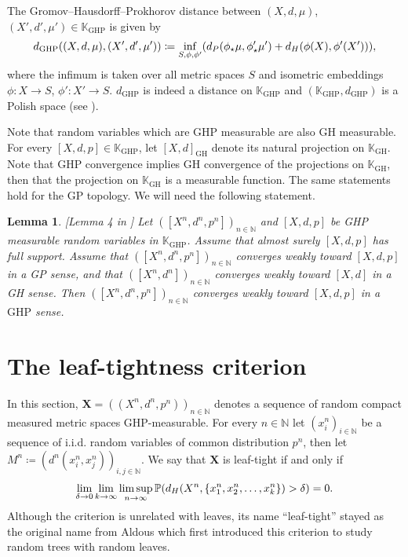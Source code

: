 \documentclass[11pt]{article}
\theoremstyle{plain}
\newtheorem{lemma}[theorem]{Lemma}
\theoremstyle{definition}
\theoremstyle{remark}
\newcommand{\N}{\mathbb{N}} %
\newcommand{\1}{\mathbbm{1}} %
\newcommand{\proba}[1]{\mathbb{P}\left(#1\right)} %
\newcommand{\K}{\mathbb{K}}
\newcommand{\GH}{\text{GH}}
\newcommand{\GHP}{\text{GHP}}
\let\originalleft\left
\let\originalright\right
\renewcommand{\left}{\mathopen{}\mathclose\bgroup\originalleft}
\renewcommand{\right}{\aftergroup\egroup\originalright}
\begin{document}
 The Gromov--Hausdorff--Prokhorov distance between $(X,d,\mu)$,$(X',d',\mu')\in \K_{\GHP}$ is given by 
\[ d_{\GHP}((X,d,\mu),(X',d',\mu'))\coloneqq\inf_{S,\phi,\phi'} \left ( d_P(\phi_\star \mu, \phi'_\star\mu')+d_H(\phi(X), \phi'(X')) \right ),\]
where the infimum is taken over all metric spaces $S$ and isometric embeddings $\phi :X\to S$, $\phi' :X'\to S$. $d_{\GHP}$ is indeed a distance on $\K_{\GHP}$ and $(\K_{\GHP},d_{\GHP})$ is a Polish space (see  \cite{ADH13}).

Note that random variables which are $\GHP$ measurable are also $\GH$ measurable. For every $[X,d,p]\in \K_{\GHP}$, let $[X,d]_{\GH}$ denote its natural projection on $\K_{\GH}$. Note that GHP convergence implies GH convergence of the projections on $\K_{\GH}$, then that the projection on $\K_{\GH}$ is a measurable function. The same statements hold for the GP topology. We will need the following statement.

\begin{lemma} \label{GP+GH=GHP}[Lemma 4 in \cite{Bla21}] Let $([X^n,d^n,p^n])_{n\in \N}$ and $[X,d,p]$ be GHP measurable random variables in $\K_{\GHP}$. Assume that almost surely $[X,d,p]$ has full support. Assume that $([X^n,d^n,p^n])_{n\in \N}$ converges weakly toward $[X,d,p]$ in a GP sense, and that $([X^n,d^n])_{n\in \N}$ converges weakly toward $[X,d]$ in a GH sense. Then $([X^n,d^n,p^n])_{n\in \N}$ converges weakly toward $[X,d,p]$ in a $\GHP$ sense.
\end{lemma}



\section{The leaf-tightness criterion}
\label{sec:leaf}
In this section, $\mathbf X=((X^n,d^n,p^n))_{n\in \N}$ denotes  a sequence of random compact measured metric spaces GHP-measurable. For every $n\in \N$ let $(x_i^n)_{i\in \N}$ be a sequence of i.i.d. random variables of common distribution $p^n$, then let $M^n\coloneqq(d^n(x_i^n,x_j^n))_{i,j\in \N}$. We say that $\mathbf X$ is leaf-tight if and only if
\begin{equation} \lim_{\delta\to 0} \lim_{k\to \infty} \limsup_{n\to \infty} \proba{d_H(X^n,\{x^n_1,x^n_2,\ldots,x^n_k\})>\delta } = 0. \label{eq:leaf-tight} \end{equation}
Although the criterion is unrelated with leaves, its name ``leaf-tight'' stayed as the original name from Aldous \cite{Ald93} which first introduced this criterion to study random trees with random leaves. 
\end{document}
